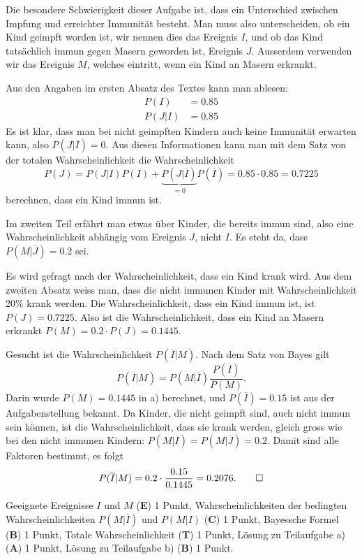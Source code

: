 \begin{loesung}
Die besondere Schwierigkeit dieser Aufgabe ist, dass ein Unterschied
zwischen Impfung und erreichter Immunität besteht.
Man muss also unterscheiden, ob ein Kind geimpft worden ist, wir nennen
dies das Ereignis $I$, und ob das Kind tatsächlich immun gegen Masern
geworden ist, Ereignis $J$. 
Ausserdem verwenden wir das Ereignis $M$, welches eintritt, wenn ein
Kind an Masern erkrankt.

Aus den Angaben im ersten Absatz des Textes kann man ablesen:
\begin{align*}
P(I)&=0.85
\\
P(J|I)&=0.85
\end{align*}
Es ist klar, dass man bei nicht geimpften Kindern auch keine Immunität
erwarten kann, also $P(J|\overline{I})=0$.
Aus diesen Informationen kann man mit dem Satz von der totalen
Wahrscheinlichkeit
die Wahrscheinlichkeit
\[
P(J)
=
P(J|I)P(I) + \underbrace{P(J|\overline{I})}_{\displaystyle=0}P(\overline{I})
= 
0.85 \cdot 0.85=0.7225
\]
berechnen, dass ein Kind immun ist.

Im zweiten Teil erfährt man etwas über Kinder, die bereits immun sind,
also eine Wahrscheinlichkeit abhängig vom Ereignis $J$, nicht $I$.
Es steht da, dass $P(M|\overline{J})=0.2$ sei.

\begin{teilaufgaben}
\item
Es wird gefragt nach der Wahrscheinlichkeit, dass ein Kind krank wird.
Aus dem zweiten Absatz weiss man, dass die nicht immunen Kinder mit
Wahrscheinlichkeit 20\% krank werden.
Die Wahrscheinlichkeit, dass ein Kind immun ist, ist $P(J)=0.7225$.
Also ist die Wahrscheinlichkeit, dass ein Kind an Masern erkrankt
$P(M)=0.2\cdot P(J)=0.1445$.
\item
Gesucht ist die Wahrscheinlichkeit $P(\overline{I}|M)$.
Nach dem Satz von Bayes gilt
\[
P(\overline{I}|M)
=
P(M|\overline{I})\frac{P(\overline{I})}{P(M)}.
\]
Darin wurde $P(M)=0.1445$ in a) berechnet, und $P(\overline{I})=0.15$
ist aus der Aufgabenstellung bekannt.
Da Kinder, die nicht geimpft sind, auch nicht immun sein können,
ist die Wahrscheinlichkeit, dass sie krank werden, gleich gross wie
bei den nicht immunen Kindern: $P(M|\overline{I})=P(M|\overline{J})=0.2$.
Damit sind alle Faktoren bestimmt, es folgt
\[
P(\overline{I}|M)
=
0.2\cdot\frac{0.15}{0.1445}
=
0.2076.
\qedhere
\]
\end{teilaufgaben}
\end{loesung}

\begin{bewertung}
Geeignete Ereignisse $I$ und $M$ ({\bf E}) 1 Punkt,
Wahrscheinlichkeiten der bedingten Wahrscheinlichkeiten $P(M|\overline{I})$
und $P(M|I)$ ({\bf C}) 1 Punkt,
Bayessche Formel ({\bf B}) 1 Punkt,
Totale Wahrscheinlichkeit ({\bf T}) 1 Punkt,
Lösung zu Teilaufgabe a) ({\bf A}) 1 Punkt,
Lösung zu Teilaufgabe b) ({\bf B}) 1 Punkt.
\end{bewertung}

